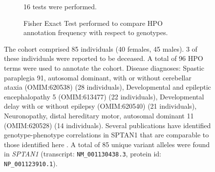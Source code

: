 \begin{figure}[htbp]
\begin{subfigure}[b]{0.95\textwidth}
{        16 tests were performed. }
\end{subfigure}
\vspace{2em}
\begin{subfigure}[b]{0.95\textwidth}
\centering
{}
\captionsetup{justification=raggedright,singlelinecheck=false}
\caption{Fisher Exact Test performed to compare HPO annotation frequency with respect to genotypes. }
\end{subfigure}

\vspace{2em}

\caption{ The cohort comprised 85 individuals (40 females, 45 males). 3 of these individuals were reported to be deceased. A total of 96 HPO terms were used to annotate the cohort. Disease diagnoses: Spastic paraplegia 91, autosomal dominant, with or without cerebellar ataxia (OMIM:620538) (28 individuals), Developmental and epileptic encephalopathy 5 (OMIM:613477) (22 individuals), Developmental delay with or without epilepsy (OMIM:620540) (21 individuals), Neuronopathy, distal hereditary motor, autosomal dominant 11 (OMIM:620528) (14 individuals). Several publications have identified genotype-phenotype correlations in SPTAN1 that are comparable to those
identified here \cite{PMID_25631096,PMID_36331550,PMID_35150594}.
 A total of 85 unique variant alleles were found in \textit{SPTAN1} (transcript: \texttt{NM\_001130438.3}, protein id: \texttt{NP\_001123910.1}).}
\end{figure}
